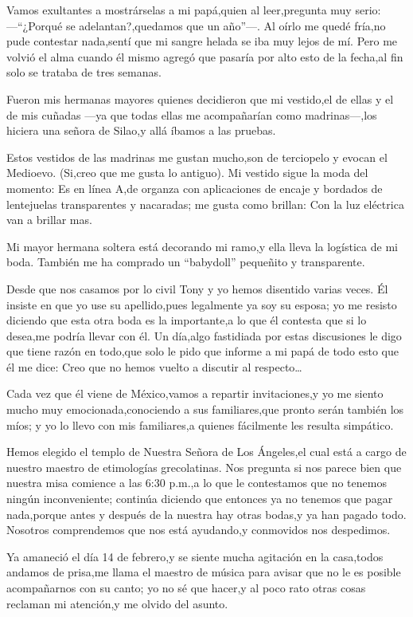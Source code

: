 \documentclass[letterpaper,12pt]{book}
\begin{document}
Vamos exultantes a mostrárselas a mi papá,quien al leer,pregunta muy serio: ---``¿Porqué se adelantan?,quedamos que un año''---. Al oírlo me quedé fría,no pude contestar nada,sentí que mi sangre helada se iba muy lejos de mí. Pero me volvió el alma cuando él mismo agregó que pasaría por alto esto de la fecha,al fin solo se trataba de tres semanas.

Fueron mis hermanas mayores quienes decidieron que mi vestido,el de ellas y el de mis cuñadas ---ya que todas ellas me acompañarían como madrinas---,los hiciera una señora de Silao,y allá íbamos a las pruebas.

Estos vestidos de las madrinas me gustan mucho,son de terciopelo y evocan el Medioevo. (Si,creo que me gusta lo antiguo).  
Mi vestido sigue la moda del momento: Es en línea A,de organza con aplicaciones de encaje y bordados de lentejuelas transparentes y nacaradas; me gusta como brillan: Con la luz eléctrica van a brillar mas.

Mi mayor hermana soltera está decorando mi ramo,y ella lleva la logística de mi boda. También me ha comprado un ``babydoll'' pequeñito y transparente.

Desde que nos casamos por lo civil Tony y yo hemos disentido varias veces. Él insiste en que yo use su apellido,pues legalmente ya soy su esposa; yo me resisto diciendo que esta otra boda es la importante,a lo que él contesta que si lo desea,me podría llevar con él. Un día,algo fastidiada por estas discusiones le digo que tiene razón en todo,que solo le pido que informe a mi papá de todo esto que él me dice: Creo que no hemos vuelto a discutir al respecto\ldots

Cada vez que él viene de México,vamos a repartir invitaciones,y yo me siento mucho muy emocionada,conociendo a sus familiares,que pronto serán también los míos; y yo lo llevo con mis familiares,a quienes fácilmente les resulta simpático.

Hemos elegido el templo de Nuestra Señora de Los Ángeles,el cual está a cargo de nuestro maestro de etimologías grecolatinas. Nos pregunta si nos parece bien que nuestra misa comience a las 6:30 p.m.,a lo que le contestamos que no tenemos ningún inconveniente; continúa diciendo que entonces ya no tenemos que pagar nada,porque antes y después de la nuestra hay otras bodas,y ya han pagado todo. Nosotros comprendemos que nos está ayudando,y conmovidos nos despedimos.

Ya amaneció el día 14 de febrero,y se siente mucha agitación en la casa,todos andamos de prisa,me llama el maestro de música para avisar que no le es posible acompañarnos con su canto; yo no sé que hacer,y al poco rato otras cosas reclaman mi atención,y me olvido del asunto.
\end{document}
